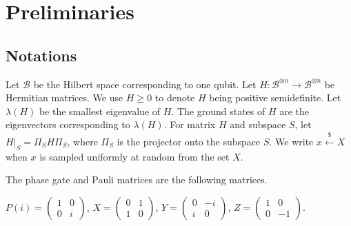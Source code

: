\section{Preliminaries}

\subsection{Notations}

Let $\mathcal{B}$ be the Hilbert space corresponding to one qubit. Let $H:\mathcal{B}^{\otimes n}\rightarrow\mathcal{B}^{\otimes n}$ be Hermitian matrices. We use $H\geq0$ to denote $H$ being positive semidefinite. Let $\lambda(H)$ be the smallest eigenvalue of $H$. The ground states of $H$ are the eigenvectors corresponding to $\lambda(H)$. For matrix $H$ and subspace $S$, let $H\big|_S=\Pi_S H \Pi_S$, where $\Pi_S$ is the projector onto the subspace $S$.
We write $x\xleftarrow{\$}X$ when $x$ is sampled uniformly at random from the set $X$.

The phase gate and Pauli matrices are the following matrices.

\begin{definition}
    $P(i)=\begin{pmatrix}1&0\\0&i\end{pmatrix}$,
    $X=\begin{pmatrix}0&1\\1&0\end{pmatrix}$,
    $Y=\begin{pmatrix}0&-i\\i&0\end{pmatrix}$,
    $Z=\begin{pmatrix}1&0\\0&-1\end{pmatrix}$.
\end{definition}

